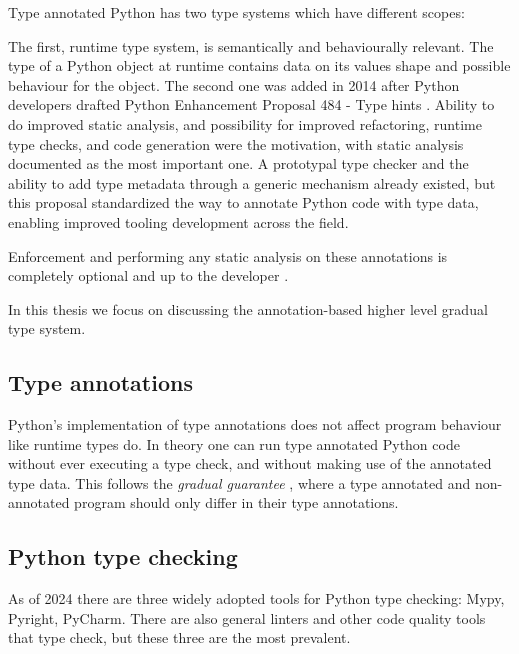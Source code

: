Type annotated Python has two type systems which have different scopes:

The first, runtime type system, is semantically and behaviourally relevant. The type of a Python object at runtime contains data on its values shape and possible behaviour for the object. 
The second one was added in 2014 after Python developers drafted Python Enhancement Proposal 484 - Type hints \cite{pep_484}. Ability to do improved static analysis, and possibility for improved refactoring, runtime type checks, and code generation were the motivation, with static analysis documented as the most important one. A prototypal type checker and the ability to add type metadata through a generic mechanism already existed, but this proposal standardized the way to annotate Python code with type data, enabling improved tooling development across the field.

Enforcement and performing any static analysis on these annotations is completely optional and up to the developer \cite{python_typing}.

In this thesis we focus on discussing the annotation-based higher level gradual type system.

\subsection{Type annotations}
Python's implementation of type annotations does not affect program behaviour like runtime types do. In theory one can run type annotated Python code without ever executing a type check, and without making use of the annotated type data. This follows the \emph{gradual guarantee} \cite{siek_refined_gradual_2015}, where a type annotated and non-annotated program should only differ in their type annotations.


 
\subsection{Python type checking}

As of 2024 there are three widely adopted tools for Python type checking: Mypy, Pyright, PyCharm. There are also general linters and other code quality tools that type check, but these three are the most prevalent.

